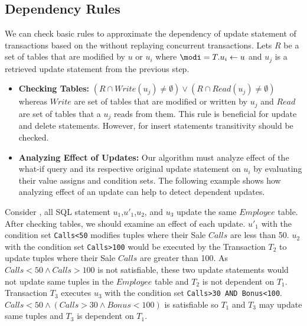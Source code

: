 \subsection{Dependency Rules}
\label{def:basic-rules}
We can check basic rules to approximate the dependency of update statement of transactions based on the  without replaying concurrent transactions. Lets $R$ be a set of tables that are modified by $u$ or $u_i$ where $\modi = T.u_i \gets u$ and $u_j$ is a retrieved update statement from the previous step.
\begin{itemize}
\item \textbf{Checking Tables:} $(R \cap Write(u_j)\neq \emptyset) \vee (R \cap Read(u_j)\neq \emptyset)$  whereas $Write$ are set of tables that are modified or written by $u_j$ and $Read$ are set of tables that a $u_j$ reads from them. This rule is beneficial for update and delete statements. However, for insert statements transitivity should be checked.
\item \textbf{Analyzing Effect of Updates:} Our algorithm must analyze effect of the what-if query and its respective original update statement on $u_i$
by evaluating their value assigns and condition sets. The following example shows how analyzing effect of an update can help to detect dependent updates.
\end{itemize}
\begin{exam}
\label{ex:algo-example}
Consider , all SQL statement $u_1$,$u'_1$,$u_2$, and $u_3$ update the same $Employee$ table. After checking tables, we should examine an effect of each update. $u'_1$ with the condition set \lstinline!Calls<50! modifies tuples where their Sale $Calls$ are less than 50. $u_2$ with the condition set \lstinline!Calls>100! would be executed by the Transaction $T_2$ to update tuples where their Sale $Calls$ are greater than 100. As $Calls<50 \wedge Calls>100$ is not satisfiable, these two update statements would not update same tuples in the $Employee$ table and $T_2$ is not dependent on $T_1$. Transaction $T_3$ executes $u_3$ with the condition set \lstinline!Calls>30 AND Bonus<100!. $Calls<50 \wedge (Calls>30 \wedge Bonus<100)$ is satisfiable so $T_1$ and $T_3$ may update same tuples and $T_3$ is dependent on $T_1$.
\end{exam}
